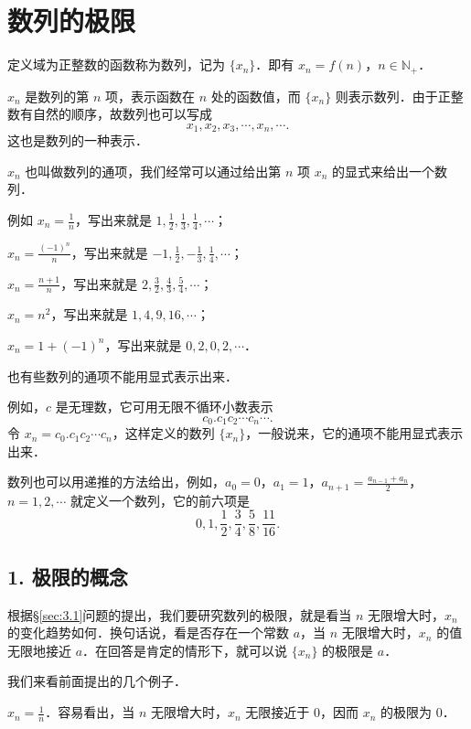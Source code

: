 \section{数列的极限}\label{sec:3.2}

\begin{definition}\label{def:3-1}
定义域为正整数的函数称为数列，记为 $\{x_n\}$．即有 $x_n = f(n)$，$n \in \mathbb{N}_+$．
\end{definition}

$x_n$ 是数列的第 $n$ 项，表示函数在 $n$ 处的函数值，而 $\{x_n\}$ 则表示数列．由于正整数有自然的顺序，故数列也可以写成
\[
x_1, x_2, x_3, \cdots, x_n, \cdots.
\]
这也是数列的一种表示．

$x_n$ 也叫做数列的通项，我们经常可以通过给出第 $n$ 项 $x_n$ 的显式来给出一个数列．

例如 $x_n = \frac{1}{n}$，写出来就是 $1, \frac{1}{2}, \frac{1}{3}, \frac{1}{4}, \cdots$；

$x_n = \frac{(-1)^n}{n}$，写出来就是 $-1, \frac{1}{2}, -\frac{1}{3}, \frac{1}{4}, \cdots$；

$x_n = \frac{n+1}{n}$，写出来就是 $2, \frac{3}{2}, \frac{4}{3}, \frac{5}{4}, \cdots$；

$x_n = n^2$，写出来就是 $1, 4, 9, 16, \cdots$；

$x_n = 1+(-1)^n$，写出来就是 $0, 2, 0, 2, \cdots$．

也有些数列的通项不能用显式表示出来．

例如，$c$ 是无理数，它可用无限不循环小数表示
\[
c_0.c_1c_2\cdots c_n\cdots.
\]
令 $x_n = c_0.c_1c_2\cdots c_n$，这样定义的数列 $\{x_n\}$，一般说来，它的通项不能用显式表示出来．

数列也可以用递推的方法给出，例如，$a_0 = 0$，$a_1 = 1$，$a_{n+1} = \frac{a_{n-1}+a_n}{2}$，$n=1,2,\cdots$ 就定义一个数列，它的前六项是
\[
0, 1, \frac{1}{2}, \frac{3}{4}, \frac{5}{8}, \frac{11}{16}.
\]

\subsection*{1. 极限的概念}

根据§\ref{sec:3.1}问题的提出，我们要研究数列的极限，就是看当 $n$ 无限增大时，$x_n$ 的变化趋势如何．换句话说，看是否存在一个常数 $a$，当 $n$ 无限增大时，$x_n$ 的值无限地接近 $a$．在回答是肯定的情形下，就可以说 $\{x_n\}$ 的极限是 $a$．

我们来看前面提出的几个例子．

\begin{example}\label{ex:3-2-1}
$x_n = \frac{1}{n}$．容易看出，当 $n$ 无限增大时，$x_n$ 无限接近于 $0$，因而 $x_n$ 的极限为 $0$．
\end{example}

